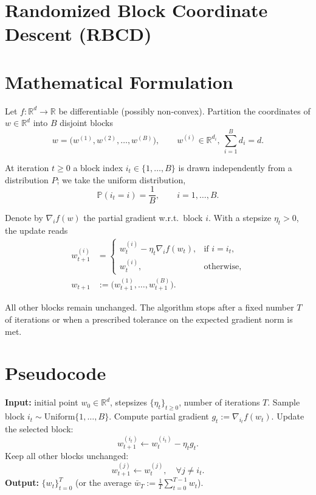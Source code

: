 \documentclass{article}
\newcommand{\R}{\mathbb{R}}
\begin{document}
\section*{Randomized Block Coordinate Descent (RBCD)}

\section*{Mathematical Formulation}
Let $f:\R^{d}\rightarrow\R$ be differentiable (possibly non‑convex).  
Partition the coordinates of $w\in\R^{d}$ into $B$ disjoint blocks
\[
w = \big( w^{(1)},w^{(2)},\dots ,w^{(B)} \big),\qquad 
w^{(i)}\in\R^{d_i},\ \sum_{i=1}^{B}d_i=d .
\]

At iteration $t\ge 0$ a block index $i_t\in\{1,\dots ,B\}$ is drawn
independently from a distribution $P$; we take the uniform distribution,
\[
\mathbb{P}(i_t = i)=\frac1B,\qquad i=1,\dots ,B .
\]

Denote by $\nabla_i f(w)$ the partial gradient w.r.t.\ block $i$.  
With a stepsize $\eta_t>0$, the update reads
\[
\boxed{
\begin{aligned}
w_{t+1}^{(i)} &=
\begin{cases}
w_{t}^{(i)} - \eta_t \nabla_i f(w_t), & \text{if } i=i_t,\\[4pt]
w_{t}^{(i)}, & \text{otherwise},
\end{cases}\\[4pt]
w_{t+1} &:=\big( w_{t+1}^{(1)},\dots ,w_{t+1}^{(B)}\big).
\end{aligned}}
\tag{1}
\]

All other blocks remain unchanged.  The algorithm stops after a fixed
number $T$ of iterations or when a prescribed tolerance on the
expected gradient norm is met.

\section*{Pseudocode}
\begin{algorithm}[H]
\caption{Randomized Block Coordinate Descent}
\begin{algorithmic}[1]
\STATE \textbf{Input:} initial point $w_0\in\R^{d}$, stepsizes $\{\eta_t\}_{t\ge0}$, number of iterations $T$.
\STATE Sample block $i_t\sim\text{Uniform}\{1,\dots ,B\}$.
\STATE Compute partial gradient $g_t:=\nabla_{i_t} f(w_t)$.
\STATE Update the selected block:
\[
w_{t+1}^{(i_t)} \gets w_t^{(i_t)} - \eta_t g_t .
\]
\STATE Keep all other blocks unchanged:
\[
w_{t+1}^{(j)} \gets w_t^{(j)},\quad \forall j\neq i_t .
\]
\ENDFOR
\STATE \textbf{Output:} $\{w_t\}_{t=0}^{T}$ (or the average $\bar w_T:=\frac1T\sum_{t=0}^{T-1}w_t$).
\end{algorithmic}
\end{algorithm}
\end{document}
